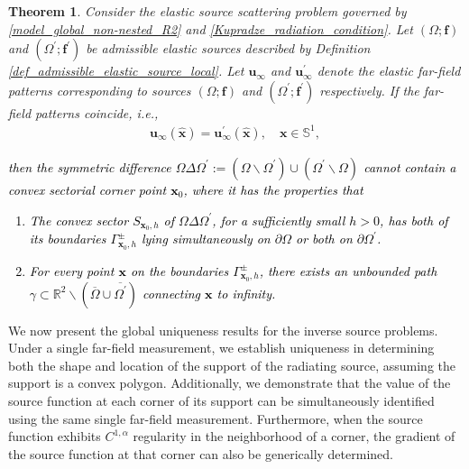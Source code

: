 \documentclass[11pt,reqno,oneside]{amsart}
\newtheorem{theorem}{Theorem}[section]
\theoremstyle{definition}
\theoremstyle{remark}
\numberwithin{equation}{section}
\numberwithin{equation}{section}
\theoremstyle{remark}
\begin{document}
\begin{theorem} \label{thm_inverse_problem_local_uniqueness}
Consider the elastic source scattering problem governed by \eqref{model_global_non-nested_R2} and \eqref{Kupradze_radiation_condition}. Let $\left(\Omega; \mathbf{f}\right)$ and $\left(\Omega^{\prime}; \mathbf{f}^{\prime}\right)$ be admissible elastic sources described by Definition \ref{def_admissible_elastic_source_local}. Let $ \mathbf{u}_{\infty} $ and $ \mathbf{u}_{\infty}^{\prime} $ denote the elastic far-field patterns corresponding to sources $\left(\Omega; \mathbf{f}\right)$ and $\left(\Omega^{\prime}; \mathbf{f}^{\prime}\right)$ respectively. If the far-field patterns coincide, i.e.,
	\begin{align*} 
		\mathbf{u}_{\infty}\left(\hat{\mathbf{x}}\right) =\mathbf{u}_{\infty}^{\prime} \left(\hat{\mathbf{x}}\right) , \quad  \mathbf{x}\in\mathbb{S}^1, 
	\end{align*}
\textcolor{black}{then the symmetric difference $ \Omega\Delta\Omega^{\prime}:=\left(\Omega\backslash\Omega^{\prime}\right)\cup\left(\Omega^{\prime}\backslash\Omega\right) $ cannot contain a convex sectorial corner point $\mathbf{x}_0$, where it has the properties that
	\begin{enumerate} [(1)]
		\item The convex sector $ S_{\mathbf{x}_0,h} $ of $\Omega\Delta\Omega^{\prime}$, for a sufficiently small $h>0$, has both of its boundaries $ \Gamma_{\mathbf{x}_0,h}^\pm $ lying simultaneously on $ \partial\Omega$ or both on $ \partial\Omega^{\prime} $.
		\item For every point $\mathbf{x}$ on the boundaries $ \Gamma_{\mathbf{x}_0,h}^\pm $, there exists an unbounded path $\gamma\subset\mathbb{R}^2\backslash\left(\overline{\Omega}\cup\overline{\Omega^\prime}\right)$ connecting $\mathbf{x}$ to infinity.
\end{enumerate}}
\end{theorem}



We now present the global uniqueness results for the inverse source problems. Under a single far-field measurement, we establish uniqueness in determining both the shape and location of the support of the radiating source, assuming the support is a convex polygon. Additionally, we demonstrate that the value of the source function at each corner of its support can be simultaneously identified using the same single far-field measurement. Furthermore, when the source function exhibits $C^{1,\alpha}$ regularity in the neighborhood of a corner, the gradient of the source function at that corner can also be generically determined. 
\end{document}
